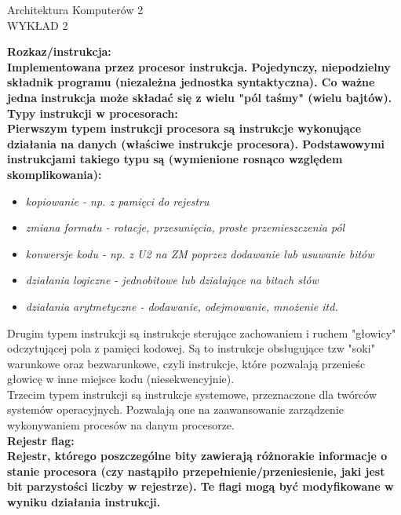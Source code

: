 \documentclass[a4paper,12pt]{article}
\newcommand{\h}[1]{\noindent \bf #1 \rm \\ \noindent}
\newcommand{\italic}[1]{\it #1 \rm}
\begin{document}
\begin{center}
	\LARGE
	Architektura Komputerów 2 \\
	\large
	WYKŁAD 2 
\end{center}
\vspace{1cm}

\h{Rozkaz/instrukcja:}
Implementowana przez procesor instrukcja. Pojedynczy, niepodzielny składnik programu (niezależna jednostka syntaktyczna). Co ważne jedna instrukcja może składać się z wielu "pól taśmy" (wielu bajtów).\\

\h{Typy instrukcji w procesorach:}
Pierwszym typem instrukcji procesora są instrukcje wykonujące działania na danych (właściwe instrukcje procesora). Podstawowymi instrukcjami takiego typu są (wymienione rosnąco względem skomplikowania):
\begin{itemize}
	\item \italic{kopiowanie} - np. z pamięci do rejestru
	\item \italic{zmiana formatu} - rotacje, przesunięcia, proste przemieszczenia pól
	\item \italic{konwersje kodu} - np. z U2 na ZM poprzez dodawanie lub usuwanie bitów
	\item \italic{działania logiczne} - jednobitowe lub działające na bitach słów
	\item \italic{działania arytmetyczne} - dodawanie, odejmowanie, mnożenie itd.
\end{itemize}
\vspace{5mm}

\noindent
Drugim typem instrukcji są instrukcje sterujące zachowaniem i ruchem "głowicy" odczytującej pola z pamięci kodowej. Są to instrukcje obsługujące tzw "soki" warunkowe oraz bezwarunkowe, czyli instrukcje, które pozwalają przenieśc głowicę w inne miejsce kodu (niesekwencyjnie).\\

\noindent
Trzecim typem instrukcji są instrukcje systemowe, przeznaczone dla twórców systemów operacyjnych. Pozwalają one na zaawansowanie zarządzenie wykonywaniem procesów na danym procesorze.\\

\h{Rejestr flag:}
Rejestr, którego poszczególne bity zawierają różnorakie informacje o stanie procesora (czy nastąpiło przepełnienie/przeniesienie, jaki jest bit parzystości liczby w rejestrze). Te flagi mogą być modyfikowane w wyniku działania instrukcji.\\
\end{document}
